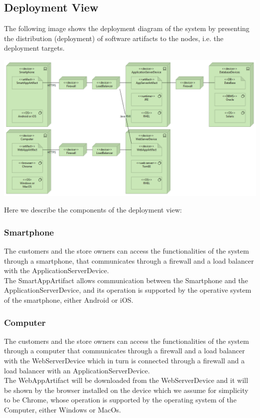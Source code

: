 \subsection{Deployment View}
The following image shows the deployment diagram of the system by presenting the distribution (deployment) of software artifacts to the nodes, i.e. the deployment targets.
\begin{flushleft}
	\includegraphics[scale=0.45]{Images/Deployment.png}
\end{flushleft}
Here we describe the components of the deployment view:
\subsubsection{Smartphone}
The customers and the store owners can access the functionalities of the system through a smartphone, that communicates through a firewall and a load balancer with the ApplicationServerDevice.\\
The SmartAppArtifact allows communication between the Smartphone and the ApplicationServerDevice, and its operation is supported by the operative system of the smartphone, either Android or iOS.
\subsubsection{Computer}
The customers and the store owners can access the functionalities of the system through a computer that communicates through a firewall and a load balancer with the WebServerDevice which in turn is connected through a firewall and a load balancer with an ApplicationServerDevice.\\
The WebAppArtifact will be downloaded from the WebServerDevice and it will be shown by the browser installed on the device which we assume for simplicity to be Chrome, whose operation is supported by the operating system of the Computer, either Windows or MacOs. 
